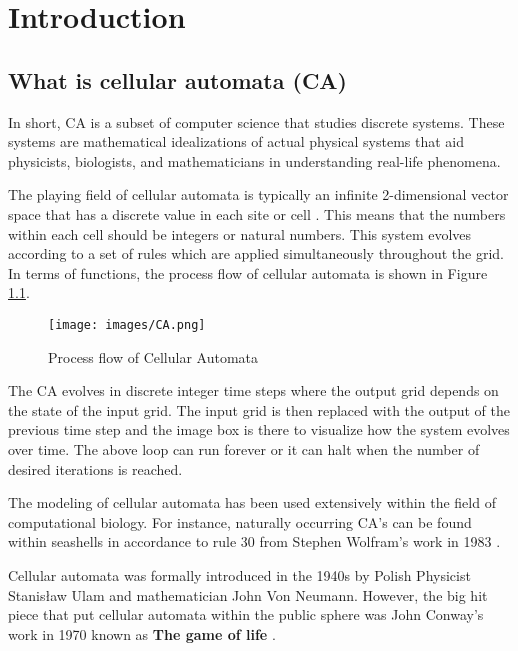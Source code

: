 \chapter{Introduction}
\section{What is cellular automata (CA)}
In short, CA is a subset of computer science that studies discrete systems. These systems are mathematical idealizations of actual physical systems that aid physicists, biologists, and mathematicians in understanding real-life phenomena.   \par

\vspace{0.3cm}
The playing field of cellular automata is typically an infinite 2-dimensional vector space that has a discrete value in each site or cell \cite{Wolfram:1983}. This means that the numbers within each cell should be integers or natural numbers. This system evolves according to a set of rules which are applied simultaneously throughout the grid. In terms of functions, the process flow of cellular automata is shown in Figure \ref{fig:my_label}. \par

\vspace{0.0cm}
\begin{figure}[H]
    \centering
    \texttt{[image: images/CA.png]}
    \caption{Process flow of Cellular Automata}
    \label{fig:my_label}
\end{figure}
 The CA evolves in discrete integer time steps where the output grid depends on the state of the input grid. The input grid is then replaced with the output of the previous time step and the image box is there to visualize how the system evolves over time. The above loop can run forever or it can halt when the number of desired iterations is reached. \par

\vspace{0,3cm}
The modeling of cellular automata has been used extensively within the field of computational biology. For instance, naturally occurring CA's can be found within seashells \cite{S.Coombes:2009} in accordance to rule 30 from Stephen Wolfram's work in 1983 \cite{Wolfram:1983}. \par

\vspace{0.3cm}
Cellular automata was formally introduced in the 1940s by Polish Physicist Stanisław Ulam and mathematician John Von Neumann. However, the big hit piece that put cellular automata within the public sphere was John Conway's work in 1970 known as \textbf{The game of life} \cite{M.Gardner:1970}.

